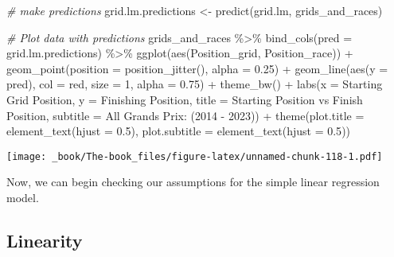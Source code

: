 \documentclass[
]{book}
\newenvironment{Shaded}{\begin{snugshade}}{\end{snugshade}}
\newcommand{\AttributeTok}[1]{\textcolor[rgb]{0.77,0.63,0.00}{#1}}
\newcommand{\CommentTok}[1]{\textcolor[rgb]{0.56,0.35,0.01}{\textit{#1}}}
\newcommand{\DecValTok}[1]{\textcolor[rgb]{0.00,0.00,0.81}{#1}}
\newcommand{\FloatTok}[1]{\textcolor[rgb]{0.00,0.00,0.81}{#1}}
\newcommand{\FunctionTok}[1]{\textcolor[rgb]{0.00,0.00,0.00}{#1}}
\newcommand{\NormalTok}[1]{#1}
\newcommand{\OtherTok}[1]{\textcolor[rgb]{0.56,0.35,0.01}{#1}}
\newcommand{\SpecialCharTok}[1]{\textcolor[rgb]{0.00,0.00,0.00}{#1}}
\newcommand{\StringTok}[1]{\textcolor[rgb]{0.31,0.60,0.02}{#1}}
\begin{document}
\begin{Shaded}
\begin{Highlighting}[]
\CommentTok{\# make predictions}
\NormalTok{grid.lm.predictions }\OtherTok{\textless{}{-}} \FunctionTok{predict}\NormalTok{(grid.lm, grids\_and\_races)}

\CommentTok{\# Plot data with predictions}
\NormalTok{grids\_and\_races }\SpecialCharTok{\%\textgreater{}\%}
  \FunctionTok{bind\_cols}\NormalTok{(}\AttributeTok{pred =}\NormalTok{ grid.lm.predictions) }\SpecialCharTok{\%\textgreater{}\%}
  \FunctionTok{ggplot}\NormalTok{(}\FunctionTok{aes}\NormalTok{(Position\_grid, Position\_race)) }\SpecialCharTok{+}
  \FunctionTok{geom\_point}\NormalTok{(}\AttributeTok{position =} \FunctionTok{position\_jitter}\NormalTok{(), }\AttributeTok{alpha =} \FloatTok{0.25}\NormalTok{) }\SpecialCharTok{+}
  \FunctionTok{geom\_line}\NormalTok{(}\FunctionTok{aes}\NormalTok{(}\AttributeTok{y =}\NormalTok{ pred), }\AttributeTok{col =} \StringTok{\textquotesingle{}red\textquotesingle{}}\NormalTok{,}
            \AttributeTok{size =} \DecValTok{1}\NormalTok{, }\AttributeTok{alpha =} \FloatTok{0.75}\NormalTok{) }\SpecialCharTok{+}
  \FunctionTok{theme\_bw}\NormalTok{() }\SpecialCharTok{+}
  \FunctionTok{labs}\NormalTok{(}\AttributeTok{x  =} \StringTok{\textquotesingle{}Starting Grid Position\textquotesingle{}}\NormalTok{,}
       \AttributeTok{y =} \StringTok{\textquotesingle{}Finishing Position\textquotesingle{}}\NormalTok{,}
       \AttributeTok{title =} \StringTok{\textquotesingle{}Starting Position vs Finish Position\textquotesingle{}}\NormalTok{,}
       \AttributeTok{subtitle =} \StringTok{\textquotesingle{}All Grands Prix: (2014 {-} 2023)\textquotesingle{}}\NormalTok{) }\SpecialCharTok{+}
  \FunctionTok{theme}\NormalTok{(}\AttributeTok{plot.title =} \FunctionTok{element\_text}\NormalTok{(}\AttributeTok{hjust =} \FloatTok{0.5}\NormalTok{),}
        \AttributeTok{plot.subtitle =} \FunctionTok{element\_text}\NormalTok{(}\AttributeTok{hjust =} \FloatTok{0.5}\NormalTok{))}
\end{Highlighting}
\end{Shaded}

\texttt{[image: \_book/The-book\_files/figure-latex/unnamed-chunk-118-1.pdf]}

Now, we can begin checking our assumptions for the simple linear regression model.

\hypertarget{linearity}{%
\subsection{Linearity}\label{linearity}}
\end{document}
